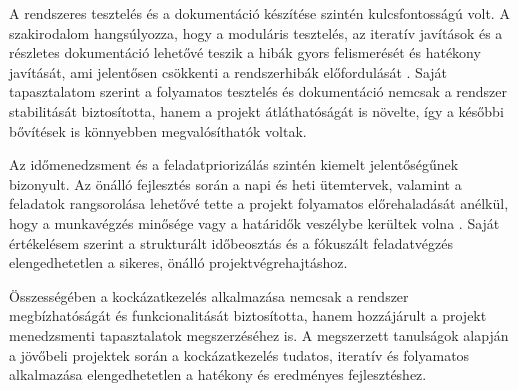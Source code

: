 A rendszeres tesztelés és a dokumentáció készítése szintén kulcsfontosságú volt. 
A szakirodalom hangsúlyozza, hogy a moduláris tesztelés, az iteratív javítások és a 
részletes dokumentáció lehetővé teszik a hibák gyors felismerését és hatékony javítását, 
ami jelentősen csökkenti a rendszerhibák előfordulását \cite{Kaposi2019,Szalay2018}. 
Saját tapasztalatom szerint a folyamatos tesztelés és dokumentáció nemcsak a rendszer 
stabilitását biztosította, hanem a projekt átláthatóságát is növelte, így a későbbi bővítések is könnyebben megvalósíthatók voltak.

Az időmenedzsment és a feladatpriorizálás szintén kiemelt jelentőségűnek bizonyult. 
Az önálló fejlesztés során a napi és heti ütemtervek, valamint a feladatok rangsorolása 
lehetővé tette a projekt folyamatos előrehaladását anélkül, hogy a munkavégzés minősége vagy a határidők veszélybe kerültek volna \cite{Kovacs2016,Hajdu2014}. 
Saját értékelésem szerint a strukturált időbeosztás és a fókuszált feladatvégzés elengedhetetlen a sikeres, önálló projektvégrehajtáshoz.

Összességében a kockázatkezelés alkalmazása nemcsak a rendszer megbízhatóságát és 
funkcionalitását biztosította, hanem hozzájárult a projekt menedzsmenti tapasztalatok megszerzéséhez is. 
A megszerzett tanulságok alapján a jövőbeli projektek során a kockázatkezelés tudatos, iteratív és folyamatos alkalmazása elengedhetetlen a hatékony és eredményes fejlesztéshez.
